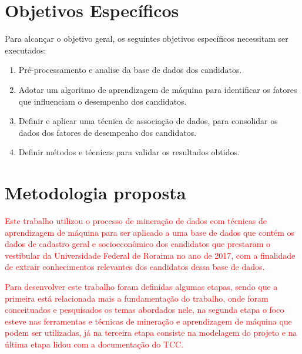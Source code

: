\section{Objetivos Específicos}

Para alcançar o objetivo geral, os seguintes objetivos específicos necessitam ser executados:


\begin{enumerate}
  \item Pré-processamento e analise da base de dados dos candidatos.
  \item Adotar um algoritmo de aprendizagem de máquina para identificar os fatores que influenciam o desempenho dos candidatos.
  \item Definir e aplicar uma técnica de associação de dados, para consolidar os dados dos fatores de desempenho dos candidatos.
  \item Definir métodos e técnicas para validar os resultados obtidos.
\end{enumerate}

\section{Metodologia proposta}

\textcolor{red}{Este trabalho utilizou o processo de mineração de dados com técnicas de aprendizagem de máquina para ser aplicado a uma base de dados que contém os dados de cadastro geral e socioeconômico dos candidatos que prestaram o vestibular da Universidade Federal de Roraima no ano de 2017, com a finalidade de extrair conhecimentos relevantes dos candidatos dessa base de dados.}

\textcolor{red}{Para desenvolver este trabalho foram definidas algumas etapas, sendo que a primeira está relacionada mais a fundamentação do trabalho, onde foram conceituados e pesquisados os temas abordados nele, na segunda etapa o foco esteve nas ferramentas e técnicas de mineração e aprendizagem de máquina que podem ser utilizadas, já na terceira etapa consiste na modelagem do projeto e na última etapa lidou com a documentação do TCC.}




